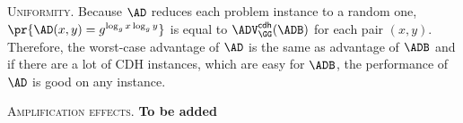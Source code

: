 \documentclass{crypto-exercise}
\begin{document}
\begin{solution}
\vspace*{2ex}
\noindent\textsc{Uniformity.} Because $\AD$ reduces each problem instance to a random one, $\pr{\AD(x,y)=g^{\log_g x\log_g y}}$ is equal to $\ADVCDH{\GG}{\ADB}$ for each pair $(x,y)$. Therefore, the worst-case advantage of $\AD$ is the same as advantage of $\ADB$ and if there are a lot of CDH instances, which are easy for $\ADB$, the performance of $\AD$ is good on any instance.

\vspace*{2ex}
\noindent\textsc{Amplification effects.}
\textbf{To be added}	
	
\end{solution}
\end{document}
